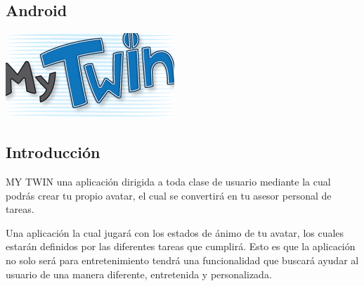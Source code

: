 \documentclass[10pt]{article}
\begin{document}
{{\begin{flushleft}
\section{Android}
\vspace{0.5in}
\begin{abstract}
\vspace{0.3in}
\large{Este es el primer trabajo de lenguajes de programaci\'on,para el cual las indicaciones fueron las de realizar un proyecto de aplicaci\'on m\'ovil, mas espec\'ifico en Android.\\
Hubieron algunas dificultades al principio, era algo nuevo para todos, a\'un no ten\'iamos clara la idea de lo que se har\'ia.\\
Entre algunas ideas, finalmente surgi\'o MY TWIN, algo que realmente nos pareci\'o novedoso y con alguna utilidad que se puede agregar a un dispositivo m\'ovil.\\
Se trabajo bastante con los recursos del tel\'efono y se hizo mucho \'enfasis en la proyecci\'on de tener un dispositivo con todo personalizado.}
\end{abstract}
\begin{center}
\vspace{0.5in}
\includegraphics[scale=0.7]{logo}
\end{center}
\end{flushleft}

\newpage
\begin{flushleft}
\subsection{Introducci\'on}

\normalsize
MY TWIN una aplicaci\'on dirigida a toda clase de usuario mediante la cual podr\'as crear tu propio avatar, el cual se convertir\'a en tu asesor personal de tareas.

Una aplicaci\'on la cual jugar\'a con los estados de \'animo de tu avatar, los cuales estar\'an definidos por las diferentes tareas que cumplir\'a. Esto es que la aplicaci\'on no solo ser\'a para entretenimiento tendr\'a una funcionalidad que buscar\'a ayudar al usuario de una manera diferente, entretenida y personalizada.\\


\end{flushleft}}}
\end{document}

